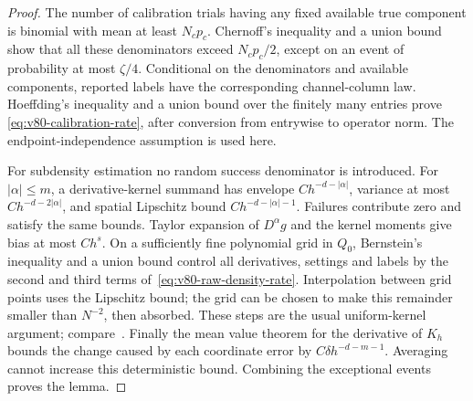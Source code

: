 \begin{proof}
The number of calibration trials having any fixed available true
component is binomial with mean at least $N_cp_c$.  Chernoff's
inequality and a union bound show that all these denominators exceed
$N_cp_c/2$, except on an event of probability at most $\zeta/4$.
Conditional on the denominators and available components, reported
labels have the corresponding channel-column law.  Hoeffding's
inequality and a union bound over the finitely many entries prove
\eqref{eq:v80-calibration-rate}, after conversion from entrywise to
operator norm.  The endpoint-independence assumption is used here.

For subdensity estimation no random success denominator is introduced.
For $|\alpha|\le m$, a derivative-kernel summand has envelope
$Ch^{-d-|\alpha|}$, variance at most $Ch^{-d-2|\alpha|}$, and
spatial Lipschitz bound $Ch^{-d-|\alpha|-1}$.  Failures contribute
zero and satisfy the same bounds.  Taylor expansion of $D^\alpha g$
and the kernel moments give bias at most $Ch^s$.  On a sufficiently
fine polynomial grid in $Q_0$, Bernstein's inequality and a union bound
control all derivatives, settings and labels by the second and third
terms of~\eqref{eq:v80-raw-density-rate}.  Interpolation between grid
points uses the Lipschitz bound; the grid can be chosen to make this
remainder smaller than $N^{-2}$, then absorbed.  These steps are the
usual uniform-kernel argument; compare~\cite{GineGuillou2002}.
Finally the mean value theorem for the derivative of $K_h$ bounds the
change caused by each coordinate error by
$C\delta h^{-d-m-1}$.  Averaging cannot increase this deterministic
bound.  Combining the exceptional events proves the lemma.
\end{proof}


